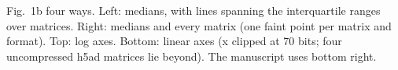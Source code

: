 \documentclass[11pt,letterpaper]{article}
\begin{document}
\noindent\textsf{\small Fig.~1b four ways. Left: medians, with lines spanning the interquartile ranges over matrices.
Right: medians and every matrix (one faint point per matrix and format). Top: log axes. Bottom: linear axes (x clipped at
70 bits; four uncompressed h5ad matrices lie beyond). The manuscript uses bottom right.}\par\medskip
\noindent
\def\fbTitle{Log axes, quartiles}\def\fbLog{1}\def\fbPts{0}\hfill
\def\fbTitle{Log axes, every matrix}\def\fbLog{1}\def\fbPts{1}\par\medskip
\noindent
\def\fbTitle{Linear axes, quartiles}\def\fbLog{0}\def\fbPts{0}\hfill
\def\fbTitle{Linear axes, every matrix (manuscript)}\def\fbLog{0}\def\fbPts{1}
\end{document}
